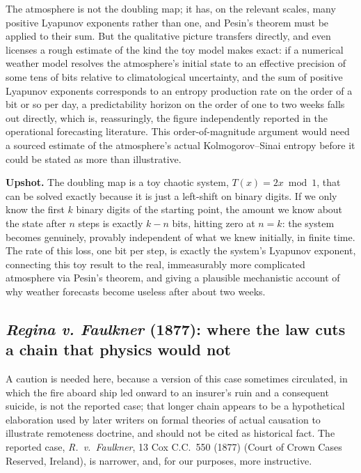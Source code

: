 \documentclass[11pt]{article}
\theoremstyle{definition}
\newcommand{\upshot}[1]{\par\smallskip\noindent\textbf{Upshot.} #1\par\smallskip}
\begin{document}
The atmosphere is not the doubling map; it has, on the relevant scales, many positive Lyapunov exponents rather than one, and Pesin's theorem must be applied to their sum. But the qualitative picture transfers directly, and even licenses a rough estimate of the kind the toy model makes exact: if a numerical weather model resolves the atmosphere's initial state to an effective precision of some tens of bits relative to climatological uncertainty, and the sum of positive Lyapunov exponents corresponds to an entropy production rate on the order of a bit or so per day, a predictability horizon on the order of one to two weeks falls out directly, which is, reassuringly, the figure independently reported in the operational forecasting literature. This order-of-magnitude argument would need a sourced estimate of the atmosphere's actual Kolmogorov--Sinai entropy before it could be stated as more than illustrative.

\upshot{The doubling map is a toy chaotic system, $T(x)=2x \bmod 1$, that can be solved exactly because it is just a left-shift on binary digits. If we only know the first $k$ binary digits of the starting point, the amount we know about the state after $n$ steps is exactly $k-n$ bits, hitting zero at $n=k$: the system becomes genuinely, provably independent of what we knew initially, in finite time. The rate of this loss, one bit per step, is exactly the system's Lyapunov exponent, connecting this toy result to the real, immeasurably more complicated atmosphere via Pesin's theorem, and giving a plausible mechanistic account of why weather forecasts become useless after about two weeks.}

\subsection{\emph{Regina v. Faulkner} (1877): where the law cuts a chain that physics would not}
\label{subsec:faulkner}

A caution is needed here, because a version of this case sometimes circulated, in which the fire aboard ship led onward to an insurer's ruin and a consequent suicide, is not the reported case; that longer chain appears to be a hypothetical elaboration used by later writers on formal theories of actual causation to illustrate remoteness doctrine, and should not be cited as historical fact. The reported case, \emph{R.\ v.\ Faulkner}, 13 Cox C.C.\ 550 (1877) (Court of Crown Cases Reserved, Ireland), is narrower, and, for our purposes, more instructive.
\end{document}

